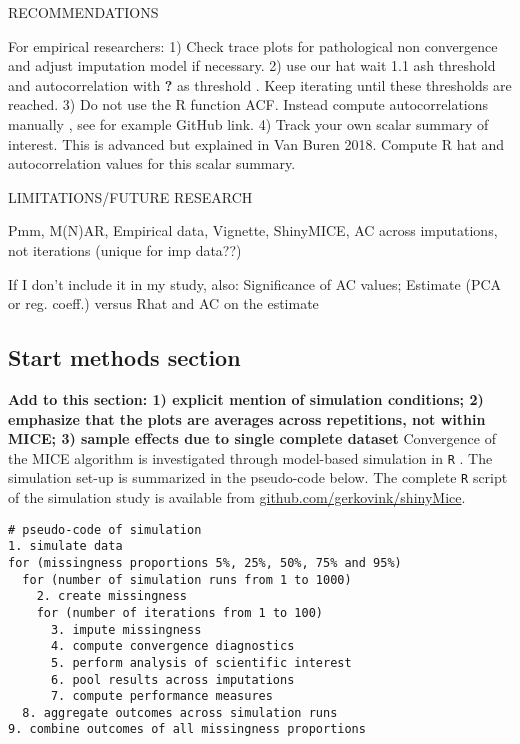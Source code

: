 \documentclass[Royal,times,sageh]{sagej}
\begin{document}
RECOMMENDATIONS

For empirical researchers: 1) Check trace plots for pathological non
convergence and adjust imputation model if necessary. 2) use our hat
wait 1.1 ash threshold and autocorrelation with \textbf{?} as threshold
. Keep iterating until these thresholds are reached. 3) Do not use the R
function ACF. Instead compute autocorrelations manually , see for
example GitHub link. 4) Track your own scalar summary of interest. This
is advanced but explained in Van Buren 2018. Compute R hat and
autocorrelation values for this scalar summary.

LIMITATIONS/FUTURE RESEARCH

Pmm, M(N)AR, Empirical data, Vignette, ShinyMICE, AC across imputations,
not iterations (unique for imp data??)

If I don't include it in my study, also: Significance of AC values;
Estimate (PCA or reg. coeff.) versus Rhat and AC on the estimate

\hypertarget{start-methods-section}{%
\subsection{Start methods section}\label{start-methods-section}}

\textbf{Add to this section: 1) explicit mention of simulation
conditions; 2) emphasize that the plots are averages across repetitions,
not within MICE; 3) sample effects due to single complete dataset}
Convergence of the MICE algorithm is investigated through model-based
simulation in \texttt{R} \citep[version 3.6.3;][]{R}. The simulation
set-up is summarized in the pseudo-code below. The complete \texttt{R}
script of the simulation study is available from
\href{https://github.com/gerkovink/shinyMice/tree/master/3.Thesis/1.SimulationStudy}{github.com/gerkovink/shinyMice}.

\begin{verbatim}
# pseudo-code of simulation 
1. simulate data 
for (missingness proportions 5%, 25%, 50%, 75% and 95%)
  for (number of simulation runs from 1 to 1000)
    2. create missingness
    for (number of iterations from 1 to 100)
      3. impute missingness
      4. compute convergence diagnostics
      5. perform analysis of scientific interest
      6. pool results across imputations
      7. compute performance measures
  8. aggregate outcomes across simulation runs 
9. combine outcomes of all missingness proportions
\end{verbatim}
\end{document}
